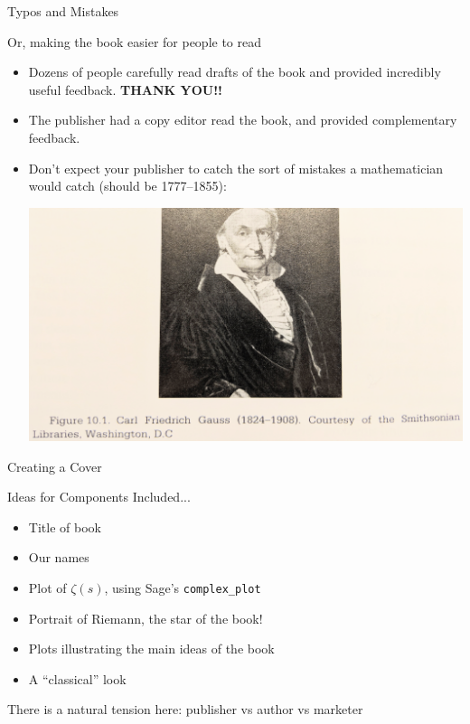 \documentclass{beamer}
\begin{document}
\begin{frame}{Typos and Mistakes}
  \begin{block}{Or, making the book easier for people to read}
    \begin{itemize}
      \item Dozens of people carefully read drafts of
            the book and provided incredibly useful feedback.
            \textbf{THANK YOU!!}
      \item The publisher had a copy editor read the book,
            and provided complementary feedback.
      \item Don't expect your publisher to catch the sort of
            mistakes a mathematician would catch (should be 1777--1855):
            \begin{center}
              \includegraphics[height=.38\textheight]{pics/gauss}
            \end{center}
    \end{itemize}
  \end{block}
\end{frame}


\begin{frame}{Creating a Cover}


  \begin{block}{Ideas for Components Included...}
    \begin{itemize}
      \item Title of book
      \item Our names
      \item Plot of $\zeta(s)$, using Sage's {\tt complex\_plot}
      \item Portrait of Riemann, the star of the book!
      \item Plots illustrating the main ideas of the book
      \item A ``classical'' look
    \end{itemize}
  \end{block}

  \vfill
  There is a natural tension here: publisher vs author vs marketer

\end{frame}
\end{document}
